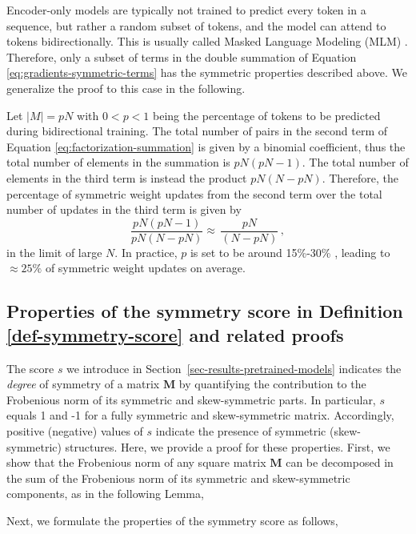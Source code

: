 Encoder-only models are typically not trained to predict every token in a sequence, but rather a random subset of tokens, and the model can attend to tokens bidirectionally.
%
This is usually called Masked Language Modeling (MLM) \citep{devlinBERTPretrainingDeep2019, liuRoBERTaRobustlyOptimized2019, lanALBERTLiteBERT2020, warnerSmarterBetterFaster2024}.
%
Therefore, only a subset of terms in the double summation of Equation \eqref{eq:gradients-symmetric-terms} has the symmetric properties described above. 
%
We generalize the proof to this case in the following.
%

%
Let $|M| = pN$ with $0<p<1$ being the percentage of tokens to be predicted during bidirectional training.
%
The total number of pairs in the second term of Equation \eqref{eq:factorization-summation} is given by a binomial coefficient, thus the total number of elements in the summation is $pN(pN - 1)$.
%
The total number of elements in the third term is instead the product $pN(N - pN)$.
%
Therefore, the percentage of symmetric weight updates from the second term over the total number of updates in the third term is given by
%
\begin{equation}
    \frac{pN(pN - 1)}{pN(N - pN)} \approx \, \frac{pN}{(N - pN)}\,,
\end{equation}
%
in the limit of large $N$.
%
In practice, $p$ is set to be around 15\%-30\% \citep{devlinBERTPretrainingDeep2019, liuRoBERTaRobustlyOptimized2019,lanALBERTLiteBERT2020,warnerSmarterBetterFaster2024}, leading to $ \approx 25\%$ of symmetric weight updates on average.
%





\subsection{Properties of the symmetry score in Definition \ref{def-symmetry-score} and related proofs}
\label{supp-math-symmetry-score}
%
The score $s$ we introduce in Section~\ref{sec-results-pretrained-models} indicates the \emph{degree} of symmetry of a matrix $\bm{M}$ by quantifying the contribution to the Frobenious norm of its symmetric and skew-symmetric parts. 
%
In particular, $s$ equals 1 and -1 for a fully symmetric and skew-symmetric matrix.
%
Accordingly, positive (negative) values of $s$ indicate the presence of symmetric (skew-symmetric) structures.
%
Here, we provide a proof for these properties. 
%
First, we show that the Frobenious norm of any square matrix $\bm{M}$ can be decomposed in the sum of the Frobenious norm of its symmetric and skew-symmetric components, as in the following Lemma,
%


%
Next, we formulate the properties of the symmetry score as follows,
%


%



